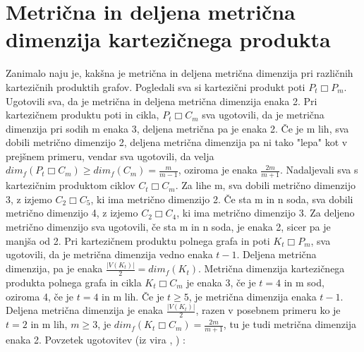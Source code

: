 \documentclass[a4paper]{report}
\begin{document}
	\section*{Metrična in deljena metrična dimenzija kartezičnega produkta}
	
	Zanimalo naju je, kakšna je metrična in deljena metrična dimenzija pri različnih kartezičnih produktih grafov. Pogledali sva si kartezični produkt poti $P_{t}\Box P_{m}$. Ugotovili sva, da je metrična in deljena metrična dimenzija enaka 2. Pri kartezičnem produktu poti in cikla, $P_{t}\Box C_{m}$ sva ugotovili, da je metrična dimenzija pri sodih m enaka 3, deljena metrična pa je enaka 2. Če je m lih, sva dobili metrično dimenzijo 2, deljena metrična dimenzija pa ni tako "lepa" kot v prejšnem primeru, vendar sva ugotovili, da velja  $dim_{f}( P_{t}\Box C_{m})\ge dim_{f}(C_{m})= \frac{m}{m-1}$, oziroma je enaka $\frac{2m}{m+1}$.
	Nadaljevali sva s kartezičnim produktom ciklov $C_{t}\Box C_{m}$. 
	Za lihe m, sva dobili metrično dimenzijo 3, z izjemo $C_{2}\Box C_{5}$, ki ima metrično dimenzijo 2. Če sta m in n soda, sva dobili metrično dimenzijo 4, z izjemo $C_{2}\Box C_{4}$, ki ima metrično dimenzijo 3. Za deljeno metrično dimenzijo sva ugotovili, če sta m in n soda, je enaka 2, sicer pa je manjša od 2. Pri kartezičnem produktu polnega grafa in poti $K_{t}\Box P_{m}$, sva ugotovili, da je metrična dimenzija vedno enaka $t-1$. Deljena metrična dimenzija, pa je enaka $\frac{|V(K_{t})|}{2} = dim_{f}(K_{t})$. Metrična dimenzija kartezičnega produkta polnega grafa in cikla $K_{t}\Box C_{m}$ je enaka 3, če je $t = 4$ in m sod, oziroma 4, če je $t = 4$ in m lih. Če je $t \ge 5$, je metrična dimenzija enaka $t-1$. Deljena metrična dimenzija je enaka $\frac{|V(K_{t})|}{2}$, razen v posebnem primeru ko je $t = 2$ in m lih, $m \ge 3 $, je $dim_f(K_{t}\Box C_{m}) = \frac{2m}{m+1}$, tu je tudi metrična dimenzija enaka 2.
	Povzetek ugotovitev (iz vira \cite{4}, \cite{5}) : 
	\\
\end{document}
